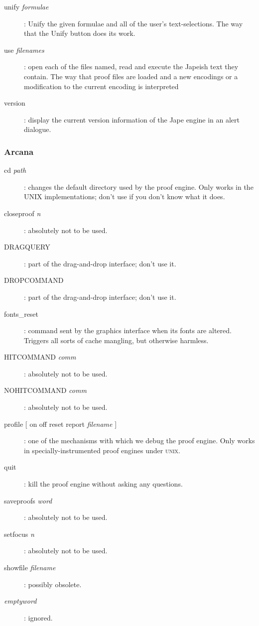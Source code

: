 \begin{description}
\item[unify \textit{formulae}]: Unify the given formulae and all of the user's text-selections. The way that the Unify button does its work.


\item[use \textit{filenames}]: open each of the files named, read and execute the Japeish text they contain. The way that proof files are loaded and a new encodings or a modification to the current encoding is interpreted


\item[version]: display the current version information of the Jape engine in an alert dialogue.

\end{description}

\subsubsection{Arcana}


\begin{description}
\item[cd \textit{path}]: changes the default directory used by the proof engine. Only works in the UNIX implementations; don't use if you don't know what it does.


\item[closeproof \textit{n}]: absolutely not to be used.

\item[DRAGQUERY]: part of the drag-and-drop interface; don't use it.

\item[DROPCOMMAND]: part of the drag-and-drop interface; don't use it.


\item[fonts\_reset]: command sent by the graphics interface when its fonts are altered. Triggers all sorts of cache mangling, but otherwise harmless.


\item[HITCOMMAND \textit{comm}]: absolutely not to be used.

\item[NOHITCOMMAND \textit{comm}]: absolutely not to be used.


\item[profile {[} on {\textbar} off {\textbar} reset {\textbar} report \textit{filename} {]}]: one of the mechanisms with which we debug the proof engine. Only works in specially-instrumented proof engines under \textsc{unix}.


\item[quit]: kill the proof engine without asking any questions.

\item[saveproofs \textit{word}]: absolutely not to be used.

\item[setfocus \textit{n}]: absolutely not to be used.

\item[showfile \textit{filename}]: possibly obsolete.

\item[\textit{emptyword}]: ignored.

\end{description}

